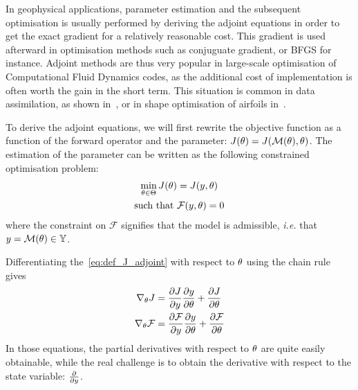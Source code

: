 \documentclass[../../Main_ManuscritThese.tex]{subfiles}
\begin{document}
In geophysical applications, parameter estimation and the subsequent
optimisation is usually performed by deriving the adjoint equations in
order to get the exact gradient for a relatively reasonable cost. This
gradient is used afterward in optimisation methods such as conjuguate
gradient, or BFGS for instance. Adjoint methods are thus very popular
in large-scale optimisation of Computational Fluid Dynamics codes, as
the additional cost of implementation is often worth the gain in the
short term. This situation is common in data assimilation, as shown
in~\cite{das_estimation_1991,das_variational_1992,honnorat_identification_2010,couderc_dassfow-shallow_2013},
or in shape optimisation of airfoils in~\cite{huyse_free-form_2001}.

To derive the adjoint equations, we will first rewrite the objective
function as a function of the forward operator and the parameter:
$J(\theta) = J(\mathcal{M}(\theta),\theta)$.  The estimation of the parameter
can be written as the following constrained optimisation problem:
\begin{equation}
  \begin{aligned}
  \min_{\kk \in \Kspace} J(\kk) &= J(y, \kk) \label{eq:def_J_adjoint} \\
  \text{such that } &\mathcal{F}(y, \kk) = 0 %
  \end{aligned}
\end{equation}
where the constraint on $\mathcal{F}$ signifies that the model is
admissible, \emph{i.e.} that $y = \mathcal{M}(\theta)\in \mathbb{Y}$.

 Differentiating the~\cref{eq:def_J_adjoint} with respect to $\theta$ using the chain rule gives
\begin{equation}
  \begin{aligned}
  \nabla_\theta J &= \frac{\partial J}{\partial y} \frac{\partial y}{\partial \theta} + \frac{\partial J}{\partial \theta}\\
    \nabla_\theta \mathcal{F} &= \frac{\partial \mathcal{F}}{\partial y} \frac{\partial y}{\partial \theta} + \frac{\partial \mathcal{F}}{\partial \theta}
  \end{aligned} \label{eq:aze}
\end{equation}
In those equations, the partial derivatives with respect to $\theta$ are quite easily obtainable, while the real challenge is to obtain the derivative with respect to the state variable: $\frac{\partial }{\partial y}$.
\end{document}
